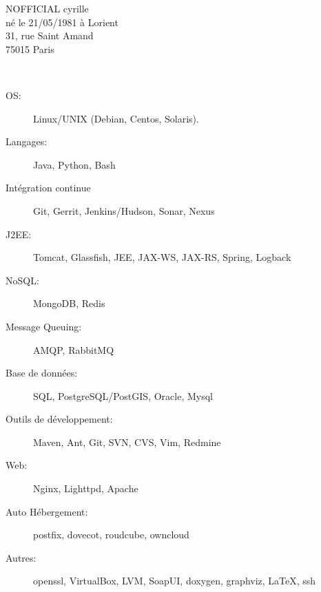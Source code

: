 \documentclass[11pt, oneside, a4paper, french]{article}
\begin{document}
\pagestyle{fancy}


      
\vspace{-5cm} 

\parbox[l]{9cm}{
  NOFFICIAL cyrille\\
  n\'e le 21/05/1981 \`a Lorient\\
  
  31, rue Saint Amand\\
  75015 Paris\\
}  


\vspace{1cm}
\begin{center}
\end{center}
\vspace{1cm}

\textbf{
  \Large{
  }
}\\
\begin{description}
\item[OS:] Linux/UNIX (Debian, Centos, Solaris).
\item[Langages:] Java, Python, Bash
\item[Int\'egration continue] Git, Gerrit, Jenkins/Hudson, Sonar, Nexus
\item[J2EE:] Tomcat, Glassfish, JEE, JAX-WS, JAX-RS, Spring, Logback
\item[NoSQL:] MongoDB, Redis
\item[Message Queuing:] AMQP, RabbitMQ
\item[Base de donn\'ees:] SQL, PostgreSQL/PostGIS, Oracle, Mysql
\item[Outils de d\'eveloppement:] Maven, Ant, Git, SVN, CVS, Vim, Redmine
\item[Web:] Nginx, Lighttpd, Apache
\item[Auto H\'ebergement:] postfix, dovecot, roudcube, owncloud
\item[Autres:] openssl, VirtualBox, LVM, SoapUI, doxygen, graphviz, \LaTeX, ssh
\end{description}
\end{document}
